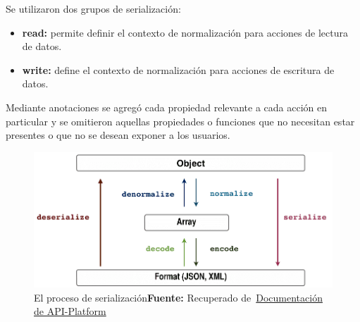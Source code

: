 Se utilizaron dos grupos de serialización:

\begin{itemize}
    \item \textbf{read:} permite definir el contexto de normalización para acciones de lectura de datos.
    \item \textbf{write:} define el contexto de normalización para acciones  de escritura de datos.
\end{itemize}

Mediante anotaciones se agregó cada propiedad relevante a cada acción en particular y se omitieron aquellas propiedades o funciones que no necesitan estar
presentes o que no se desean exponer a los usuarios.



\begin{figure}[h]
    \includegraphics[width=1\linewidth]{image/serializationWorkflow.png}
    \caption{El proceso de serialización\newline \textbf{Fuente:} Recuperado de~\href{https://api-platform.com/docs/core/serialization/}{Documentación de API-Platform}}
    \label{fig:image/serializationWorkflow}
\end{figure}





